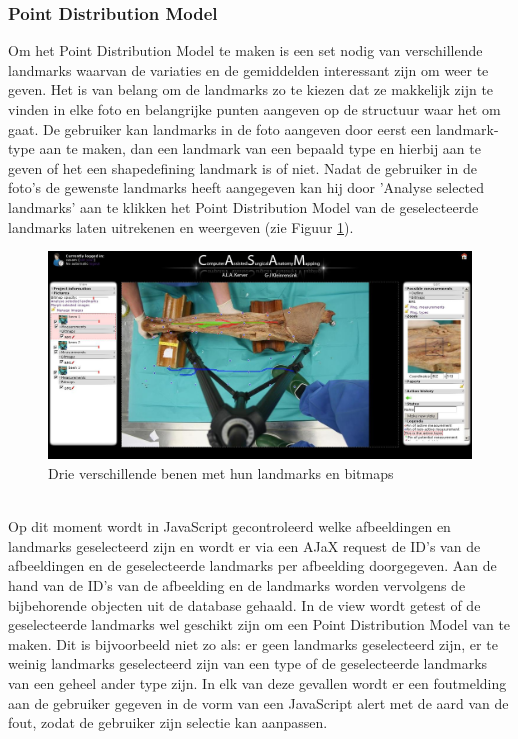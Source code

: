 \subsubsection{Point Distribution Model}
Om het Point Distribution Model te maken is een set nodig van verschillende landmarks waarvan de variaties en de gemiddelden interessant zijn om weer te geven. 
Het is van belang om de landmarks zo te kiezen dat ze makkelijk zijn te vinden in elke foto en belangrijke punten aangeven op de structuur waar het om gaat. 
De gebruiker kan landmarks in de foto aangeven door eerst een landmark-type aan te maken, dan een landmark van een bepaald type en hierbij aan te geven of het een shapedefining landmark is of niet. 
Nadat de gebruiker in de foto's de gewenste landmarks heeft aangegeven kan hij door 'Analyse selected landmarks' aan te klikken het Point Distribution Model van de geselecteerde landmarks laten uitrekenen en weergeven (zie Figuur \ref{fig:screen1}). 
\\
\begin{figure}[htbp]
\includegraphics[width=\textwidth]{screen1}
\caption{Drie verschillende benen met hun landmarks en bitmaps}
\label{fig:screen1}
\end{figure}
\\
Op dit moment wordt in JavaScript gecontroleerd welke afbeeldingen en landmarks geselecteerd zijn en wordt er via een AJaX request de ID's van de afbeeldingen en de geselecteerde landmarks per afbeelding doorgegeven. 
Aan de hand van de ID's van de afbeelding en de landmarks worden vervolgens de bijbehorende objecten uit de database gehaald. 
In de view wordt getest of de geselecteerde landmarks wel geschikt zijn om een Point Distribution Model van te maken. 
Dit is bijvoorbeeld niet zo als: er geen landmarks geselecteerd zijn, er te weinig landmarks geselecteerd zijn van een type of de geselecteerde landmarks van een geheel ander type zijn. 
In elk van deze gevallen wordt er een foutmelding aan de gebruiker gegeven in de vorm van een JavaScript alert met de aard van de fout, zodat de gebruiker zijn selectie kan aanpassen.
